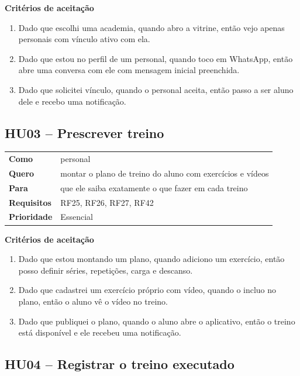 \textbf{Critérios de aceitação}
\begin{enumerate}
  \item Dado que escolhi uma academia, quando abro a vitrine, então vejo apenas personais com vínculo ativo com ela.
  \item Dado que estou no perfil de um personal, quando toco em WhatsApp, então abre uma conversa com ele com mensagem inicial preenchida.
  \item Dado que solicitei vínculo, quando o personal aceita, então passo a ser aluno dele e recebo uma notificação.
\end{enumerate}

\subsection*{HU03 -- Prescrever treino}

\begin{tabularx}{\textwidth}{@{}l L@{}}
  \toprule
  \textbf{Como}       & personal \\
  \textbf{Quero}      & montar o plano de treino do aluno com exercícios e vídeos \\
  \textbf{Para}       & que ele saiba exatamente o que fazer em cada treino \\
  \textbf{Requisitos} & RF25, RF26, RF27, RF42 \\
  \textbf{Prioridade} & Essencial \\
  \bottomrule
\end{tabularx}

\textbf{Critérios de aceitação}
\begin{enumerate}
  \item Dado que estou montando um plano, quando adiciono um exercício, então posso definir séries, repetições, carga e descanso.
  \item Dado que cadastrei um exercício próprio com vídeo, quando o incluo no plano, então o aluno vê o vídeo no treino.
  \item Dado que publiquei o plano, quando o aluno abre o aplicativo, então o treino está disponível e ele recebeu uma notificação.
\end{enumerate}

\subsection*{HU04 -- Registrar o treino executado}


